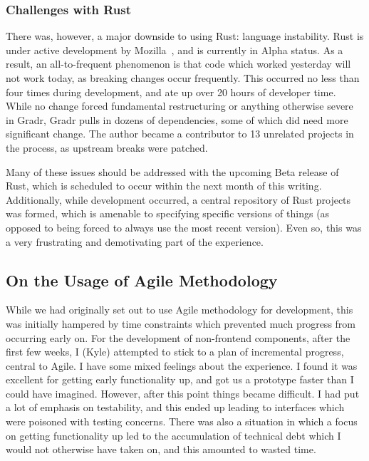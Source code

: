 \documentclass{scrartcl}
\begin{document}
\subsubsection{Challenges with Rust}
There was, however, a major downside to using Rust: language instability.
Rust is under active development by Mozilla~\cite{mozilla}, and is currently in Alpha status.
As a result, an all-to-frequent phenomenon is that code which worked yesterday will not work today, as breaking changes occur frequently.
This occurred no less than four times during development, and ate up over 20 hours of developer time.
While no change forced fundamental restructuring or anything otherwise severe in Gradr, Gradr pulls in dozens of dependencies, some of which did need more significant change.
The author became a contributor to 13 unrelated projects in the process, as upstream breaks were patched.

Many of these issues should be addressed with the upcoming Beta release of Rust, which is scheduled to occur within the next month of this writing.
Additionally, while development occurred, a central repository of Rust projects was formed, which is amenable to specifying specific versions of things (as opposed to being forced to always use the most recent version).
Even so, this was a very frustrating and demotivating part of the experience.

\subsection{On the Usage of Agile Methodology}
While we had originally set out to use Agile methodology for development, this was initially hampered by time constraints which prevented much progress from occurring early on.
For the development of non-frontend components, after the first few weeks, I (Kyle) attempted to stick to a plan of incremental progress, central to Agile.
I have some mixed feelings about the experience.
I found it was excellent for getting early functionality up, and got us a prototype faster than I could have imagined.
However, after this point things became difficult.
I had put a lot of emphasis on testability, and this ended up leading to interfaces which were poisoned with testing concerns.
There was also a situation in which a focus on getting functionality up led to the accumulation of technical debt which I would not otherwise have taken on, and this amounted to wasted time.
\end{document}
